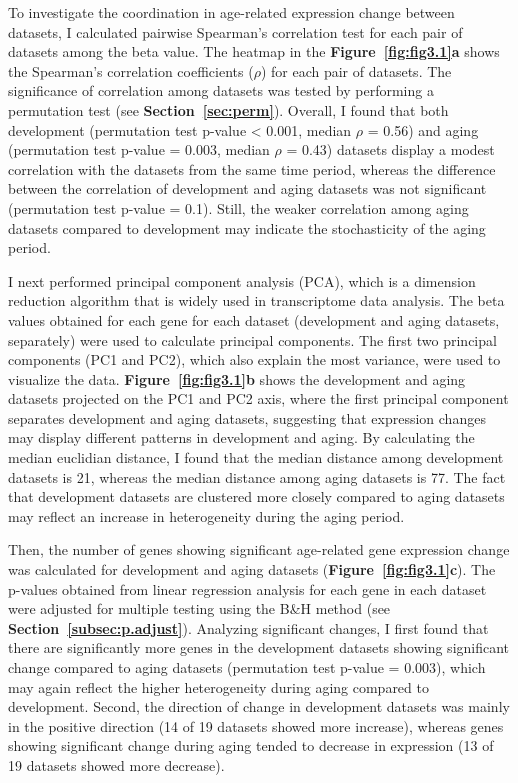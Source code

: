 To investigate the coordination in age-related expression change between datasets, 
I calculated pairwise Spearman's correlation test for each pair of datasets among the beta value.
The heatmap in the \textbf{Figure~\ref{fig:fig3.1}a} shows the Spearman's correlation coefficients ($\rho$) for each pair of datasets.
The significance of correlation among datasets was tested by performing a permutation test (see \textbf{Section~\ref{sec:perm}}).
Overall, I found that both development (permutation test p-value < 0.001, median $\rho$ = 0.56) and aging (permutation test p-value = 0.003, median $\rho$ = 0.43)
datasets display a modest correlation with the datasets from the same time period, 
whereas the difference between the correlation of development and aging datasets was not significant (permutation test p-value = 0.1).
Still, the weaker correlation among aging datasets compared to development may indicate the stochasticity of the aging period.

I next performed principal component analysis (PCA), which is a dimension reduction algorithm that is widely used in transcriptome data analysis. 
The beta values obtained for each gene for each dataset (development and aging datasets, separately) were used to calculate principal components.
The first two principal components (PC1 and PC2), which also explain the most variance, were used to visualize the data.
\textbf{Figure~\ref{fig:fig3.1}b} shows the development and aging datasets projected on the PC1 and PC2 axis, where
the first principal component separates development and aging datasets, suggesting that expression changes may display different patterns in development and aging.
By calculating the median euclidian distance, I found that the median distance among development datasets is 21, 
whereas the median distance among aging datasets is 77. 
The fact that development datasets are clustered more closely compared to aging datasets may reflect an increase in heterogeneity during the aging period.

Then, the number of genes showing significant age-related gene expression change was calculated for development and aging datasets (\textbf{Figure~\ref{fig:fig3.1}c}).
The p-values obtained from linear regression analysis for each gene in each dataset were adjusted for multiple testing using the B{\&}H method (see \textbf{Section~\ref{subsec:p.adjust}}).
Analyzing significant changes, I first found that there are significantly more genes in the development datasets showing significant change compared to aging datasets (permutation test p-value = 0.003),
which may again reflect the higher heterogeneity during aging compared to development.
Second, the direction of change in development datasets was mainly in the positive direction (14 of 19 datasets showed more increase), 
whereas genes showing significant change during aging tended to decrease in expression (13 of 19 datasets showed more decrease).

